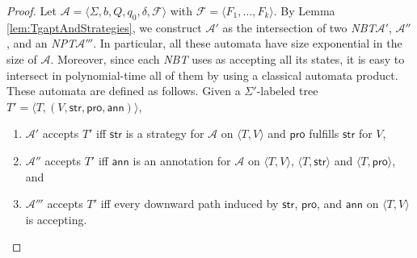 \documentclass{LMCS}
\theoremstyle{plain}
\def \A             {\mathcal{A}}
\def \ann           {\ensuremath{\mathsf{ann}}\xspace}
\def \F             {\mathcal{F}}
\def \NBT           {\emph{NBT}\xspace}
\def \NPT           {\emph{NPT}\xspace}
\def \prom          {\ensuremath{\mathsf{pro}}\xspace}
\def \strat         {\ensuremath{\mathsf{str}}\xspace}
\newcommand \tpl[1] {\langle #1 \rangle}
\begin{document}
\begin{proof}
Let $\A = \tpl{\Sigma, b, Q, q_0, \delta, \F}$ with $\F =
\tpl{F_1, \ldots, F_k}$. By Lemma \ref{lem:TgaptAndStrategies}, we
construct $\A'$ as the intersection of two \NBT $\A'$, $\A''$, and
an \NPT $\A'''$. In particular, all these automata have size
exponential in the size of $\A$. Moreover, since each \NBT uses as
accepting all its states, it is easy to intersect in
polynomial-time all of them by using a classical automata product.
These automata are defined as follows. Given a $\Sigma'$-labeled
tree $T' = \tpl{T,(V,\strat,\prom,\ann)}$,
\begin{enumerate}[(1)]
\item
$\A'$ accepts $T'$ iff $\strat$ is a strategy for $\A$ on
$\tpl{T,V}$ and $\prom$ fulfills $\strat$ for $V$,

\item
$\A''$ accepts $T'$ iff $\ann$ is an annotation for $\A$ on
$\tpl{T,V}$, $\tpl{T,\strat}$ and $\tpl{T,\prom}$, and

\item
$\A'''$ accepts $T'$ iff every downward path induced by $\strat$,
$\prom$, and $\ann$ on $\tpl{T,V}$ is accepting.
\end{enumerate}


\end{proof}
\end{document}
